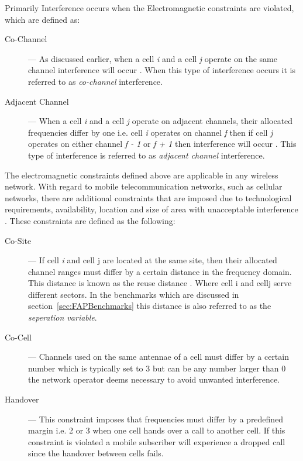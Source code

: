 Primarily Interference occurs when the Electromagnetic constraints are violated, which are defined as:
\begin{description}
\item[Co-Channel] --- As discussed earlier, when a cell \emph{i} and a cell \emph{j} operate on the same channel interference will occur \cite{WirelessCommunications,WirelessDigitalCommunications,GSMSysEngin,PrinciplesMobileCommunication,Eisenblatter,EfficientEvoChannelManagement,Karen2004,ACOvsEA,InterferenceOrientatedFAP}. When this type of interference occurs it is referred to as \emph{co-channel} interference.
\item[Adjacent Channel] --- When a cell \emph{i} and a cell \emph{j} operate on adjacent channels, their allocated frequencies differ by one i.e. cell \emph{i} operates on channel \emph{f} then if cell \emph{j} operates on either channel \emph{f - 1} or \emph{f + 1} then interference will occur \cite{WirelessCommunications,WirelessDigitalCommunications,GSMSysEngin,PrinciplesMobileCommunication,Eisenblatter,EfficientEvoChannelManagement,Karen2004,ACOvsEA,InterferenceOrientatedFAP}. This type of interference is referred to as \emph{adjacent channel} interference.
\end{description}

The electromagnetic constraints defined above are applicable in any wireless network. With regard to mobile telecommunication networks, such as cellular networks, there are additional constraints that are imposed due to technological requirements, availability, location and size of area with unacceptable interference \cite{Karen2004,Eisenblatter,AndreasPaper}. These constraints are defined as the following:
\begin{description}
\item[Co-Site] --- If cell \emph{i} and cell {j} are located at the same site, then their allocated channel ranges must differ by a certain distance in the frequency domain. This distance is known as the reuse distance \cite{FixedFAPPSO,EgyptFAPPSO,Karen2004,AndreasPaper}. Where cell {i} and cell{j} serve different sectors. In the benchmarks which are discussed in section~\ref{sec:FAPBenchmarks} this distance is also referred to as the \emph{seperation variable}. 
\item[Co-Cell] --- Channels used on the same antennae of a cell must differ by a certain number which is typically set to 3 but can be any number larger than 0 the network operator deems necessary to avoid unwanted interference\cite{Karen2004,Eisenblatter,AndreasPaper}.
\item[Handover] --- This constraint imposes that frequencies must differ by a predefined margin i.e. 2 or 3 when one cell hands over a call to another cell. If this constraint is violated a mobile subscriber will experience a dropped call since the handover between cells fails\cite{Karen2004,Eisenblatter,AndreasPaper}.
\end{description}

